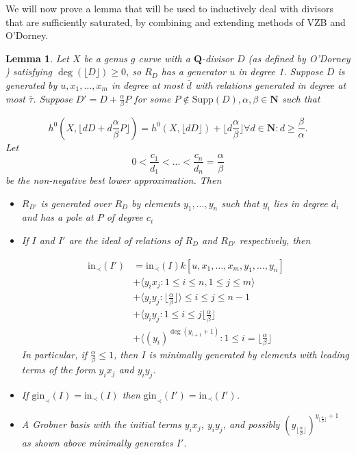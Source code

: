 \documentclass{amsart}
\theoremstyle{plain}
\newtheorem{lem}[thm]{Lemma}
\theoremstyle{definition}
\theoremstyle{remark}
\numberwithin{equation}{section}
\newcommand \Supp{\text{Supp}}
\newcommand \initial{\text{in}}
\newcommand \gin{\text{gin}}
\begin{document}
We will now prove a lemma that will be used to inductively deal with divisors that are sufficiently saturated, by combining and extending methods of VZB  and O'Dorney.

\begin{lem}
\label{lem:deg1_sat_ind}
Let $X$ be a genus $g$ curve with a $\mathbf{Q}$-divisor $D$ (as
defined by O'Dorney )
satisfying $\deg(\lfloor{D}\rfloor)\ge 0$, so $R_D$ has a
generator $u$ in degree 1.  Suppose $D$ is generated by $
u, x_1, \ldots, x_m$ in degree at most $\bar{d}$ with relations generated 
in degree at most $\bar{\tau}$.  Suppose $D' = D + \frac{\alpha}{\beta} P$
for some $P \not \in \Supp(D), \alpha,\beta \in \mathbf{N}$ such
that

\begin{equation}
\label{eqn:deg1_sat_ind_dim}
	h^0(X, \lfloor{dD + d\frac{\alpha}{\beta} P \rfloor}) = h^0(X,\lfloor dD
	\rfloor) + \lfloor d\frac{\alpha} {\beta} \rfloor \forall d \in \mathbf{
	N} : d \ge \frac{\beta}{\alpha}.
\end{equation}
Let 
\[
	0<\frac{c_1}{d_1}<...<\frac{c_n}{d_n}=\frac{\alpha}{\beta}
\]
be the non-negative best lower approximation.
Then 
\begin{itemize}
\item $R_{D'}$ is generated over $R_D$ by elements $y_1,...,y_n$ such that $y_i$ lies in  
degree $d_i$ and has a pole at $P$ of degree $c_i$

\item If $I$ and $I'$ are the ideal of relations of $R_D$ and $R_{D'}$ respectively, then 

\begin{align*}
	\initial_\prec(I') &= \initial_\prec(I) k[u, x_1, \ldots, x_m, y_1, \ldots, y_n] \\
										 &+ \langle y_i x_j: 1 \le i \le n, 1 \le j \le m \rangle \\
										 &+ \langle y_i y_j: \lfloor \frac{\alpha}{\beta} \rfloor \rangle \le i \le j \le n-1 \\
										 &+ \langle y_i y_j: 1\le i\le j\lfloor \frac{\alpha}{\beta} \rfloor\\
										 &+ \langle (y_i)^{\deg(y_{i+1}+1)}: 1\le i=\lfloor \frac{\alpha}{\beta} \rfloor
\end{align*}
In particular, if $\frac{\alpha}{\beta}\le 1$, then $I$ is minimally generated by elements with leading terms of the form $y_ix_j$ and $y_iy_j$.
\item If $\gin_\prec(I)=\initial_\prec(I)$ then $\gin_\prec(I')=\initial_\prec(I')$.
\item A Grobner basis with the initial terms $y_i x_j$, $y_iy_j$, and possibly $(y_{\lfloor \frac{\alpha}{\beta} \rfloor})^{y_{\lfloor \frac{\alpha}{\beta} \rfloor}+1}$ as shown above minimally generates $I'$.
\end{itemize}
\end{lem}
\end{document}
